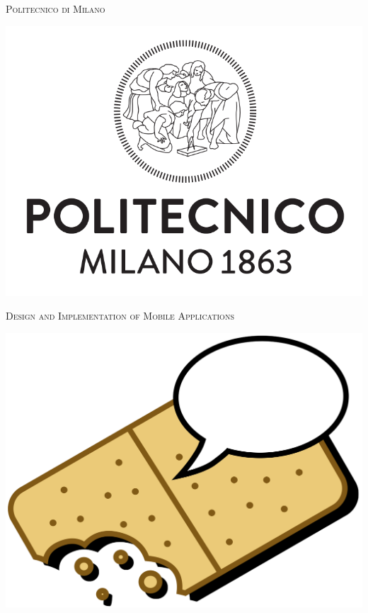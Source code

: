 



\begin{titlepage}


\begin{center}

{\Large{\scshape{Politecnico di Milano}}}
\vspace{6mm}

\includegraphics[scale=0.2]{img/polimi}
\vspace{6mm}

{\Large{\scshape{Design and Implementation of Mobile Applications}}}
\vspace{20mm}

\includegraphics[scale=0.5]{img/logo}
\vspace{8mm}


\end{center}
\end{titlepage}
